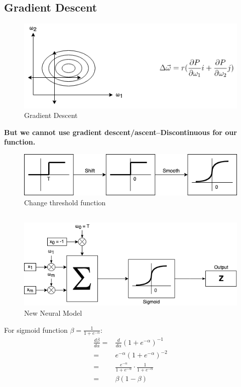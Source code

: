 \documentclass[12pt]{book}
\begin{document}
\subsection{Gradient Descent}
\begin{figure}[ht]
	\centering
	\includegraphics[scale=0.7]{Figure/Figure12_3.png}
	\caption{Gradient Descent}
\end{figure}
\textbf{But we cannot use gradient descent/ascent--Discontinuous for our function.}
\begin{figure}[ht]
	\centering
	\includegraphics[scale=0.7]{Figure/Figure12_4.png}
	\caption{Change threshold function}
\end{figure}
\subsection{}
\begin{figure}[ht]
	\centering
	\includegraphics[scale=0.7]{Figure/Figure12_5.png}
	\caption{New Neural Model}
\end{figure}
For sigmoid function $\beta=\frac{1}{1+e^{-\alpha}}$:
\begin{equation*}
\begin{aligned}
	\frac{d\beta}{d\alpha}=&\frac{d}{d\alpha}(1+e^{-\alpha})^{-1}\\
	=&e^{-\alpha}(1+e^{-\alpha})^{-2}\\
	=&\frac{e^{-\alpha}}{1+e^{-\alpha}}\cdot \frac{1}{1+e^{-\alpha}}\\
	=&\beta(1-\beta)
\end{aligned}
\end{equation*}
\newpage
\end{document}
